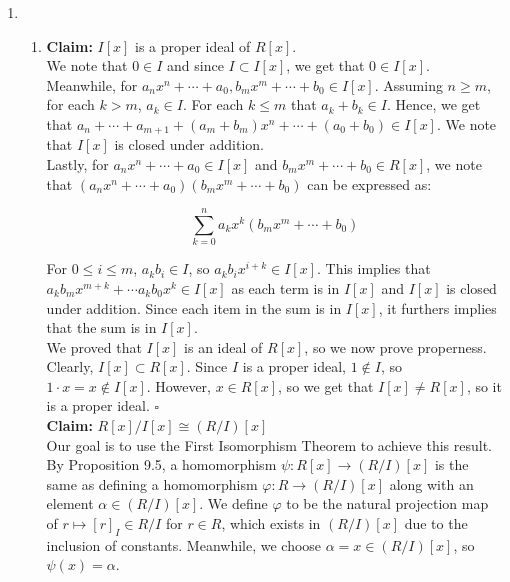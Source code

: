 \documentclass{article}
\begin{document}
\begin{enumerate}

\item 
\begin{enumerate}
    \item 
    \textbf{Claim:} $I[x]$ is a proper ideal of $R[x]$. \\

    We note that $0 \in I$ and since $I \subset I[x]$, we get that $0 \in I[x]$. \\
    
    Meanwhile, for $a_nx^n + \cdots + a_0, b_mx^m + \cdots + b_0 \in I[x]$. Assuming $n \geq m$, for each $k > m$, $a_k \in I$. For each $k \leq m$ that $a_k + b_k \in I$. Hence, we get that $a_n + \cdots + a_{m+1} + (a_m + b_m)x^n + \cdots + (a_0 + b_0) \in I[x]$. We note that $I[x]$ is closed under addition.\\

    Lastly, for $a_nx^n + \cdots + a_0 \in I[x]$ and $b_mx^m + \cdots + b_0 \in R[x]$, we note that $(a_nx^n + \cdots + a_0) (b_mx^m + \cdots + b_0)$ can be expressed as: 

    $$\sum^n_{k=0}a_kx^k(b_mx^m + \cdots + b_0)$$

    For $0 \leq i \leq m$, $a_kb_i \in I$, so $a_kb_ix^{i+k} \in I[x]$. This implies that $a_kb_mx^{m+k} + \cdots a_kb_0x^k \in I[x]$ as each term is in $I[x]$ and $I[x]$ is closed under addition. Since each item in the sum is in $I[x]$, it furthers implies that the sum is in $I[x]$. \\

    We proved that $I[x]$ is an ideal of $R[x]$, so we now prove properness. Clearly, $I[x] \subset R[x]$. Since $I$ is a proper ideal, $1 \not \in I$, so $1 \cdot x = x \notin I[x]$. However, $x \in R[x]$, so we get that $I[x] \neq R[x]$, so it is a proper ideal. \hfill $\square$  \\

    \textbf{Claim:} $R[x]/I[x] \cong (R/I)[x]$ \\

    Our goal is to use the First Isomorphism Theorem to achieve this result. \\ 

    By Proposition 9.5, a homomorphism $\psi: R[x] \rightarrow (R/I)[x]$ is the same as defining a homomorphism $\varphi: R \rightarrow (R/I)[x]$ along with an element $\alpha \in (R/I)[x]$. We define $\varphi$ to be the natural projection map of $r \mapsto [r]_I \in R/I$ for $r \in R$, which exists in $(R/I)[x]$ due to the inclusion of constants. Meanwhile, we choose $\alpha = x \in (R/I)[x]$, so $\psi(x) = \alpha$. \\


\end{enumerate}
\end{enumerate}
\end{document}

